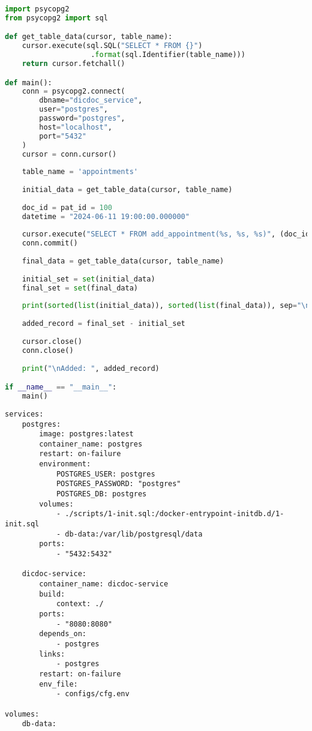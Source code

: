 \begin{lstlisting}[label=lst:testing,caption=\raggedright{Скрипт для тестирования хранимой функции},language=python]
import psycopg2
from psycopg2 import sql

def get_table_data(cursor, table_name):
	cursor.execute(sql.SQL("SELECT * FROM {}")
					.format(sql.Identifier(table_name)))
	return cursor.fetchall()

def main():
	conn = psycopg2.connect(
		dbname="dicdoc_service",
		user="postgres",
		password="postgres",
		host="localhost",
		port="5432"
	)
	cursor = conn.cursor()
	
	table_name = 'appointments'
	
	initial_data = get_table_data(cursor, table_name)
	
	doc_id = pat_id = 100
	datetime = "2024-06-11 19:00:00.000000"
	
	cursor.execute("SELECT * FROM add_appointment(%s, %s, %s)", (doc_id, pat_id, datetime,))
	conn.commit()
	
	final_data = get_table_data(cursor, table_name)
	
	initial_set = set(initial_data)
	final_set = set(final_data)
	
	print(sorted(list(initial_data)), sorted(list(final_data)), sep="\n\n")
	
	added_record = final_set - initial_set
	
	cursor.close()
	conn.close()
	
	print("\nAdded: ", added_record)

if __name__ == "__main__":
	main()

\end{lstlisting}

\clearpage
\begin{lstlisting}[label=lst:dcompose,caption=\raggedright{Содержимое файла docker-compose.yml},tabsize=2,keywordstyle=\ttfamily]
services:
	postgres:
		image: postgres:latest
		container_name: postgres
		restart: on-failure
		environment:
			POSTGRES_USER: postgres
			POSTGRES_PASSWORD: "postgres"
			POSTGRES_DB: postgres
		volumes:
			- ./scripts/1-init.sql:/docker-entrypoint-initdb.d/1-init.sql
			- db-data:/var/lib/postgresql/data
		ports:
			- "5432:5432"
	
	dicdoc-service:
		container_name: dicdoc-service
		build:
			context: ./
		ports:
			- "8080:8080"
		depends_on:
			- postgres
		links:
			- postgres
		restart: on-failure
		env_file:
			- configs/cfg.env
		
volumes:
	db-data:

\end{lstlisting}
